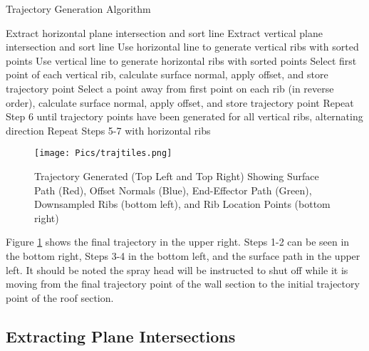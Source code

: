 \begin{algorithm}[H]
\caption{Trajectory Generation Algorithm}
\label{alg:trajgen}
\begin{algorithmic}[1]

    \State Extract horizontal plane intersection and sort line
    \State Extract vertical plane intersection and sort line
    \State Use horizontal line to generate vertical ribs with sorted points
    \State Use vertical line to generate horizontal ribs with sorted points
    \State Select first point of each vertical rib, calculate surface normal, apply offset, and store trajectory point
    \State Select a point  away from first point on each rib (in reverse order), calculate surface normal, apply offset, and store trajectory point
    \State Repeat Step 6 until trajectory points have been generated for all vertical ribs, alternating direction
    \State Repeat Steps 5-7 with horizontal ribs

\end{algorithmic}
\end{algorithm}

\begin{figure}[H]
    \centering
    \texttt{[image: Pics/trajtiles.png]}
    \caption{Trajectory Generated (Top Left and Top Right) Showing Surface Path (Red), Offset Normals (Blue), End-Effector Path (Green), Downsampled Ribs (bottom left), and Rib Location Points (bottom right)}
    \label{fig:trajtiles}
\end{figure}
Figure \ref{fig:trajtiles} shows the final trajectory in the upper right. Steps 1-2 can be seen in the bottom right, Steps 3-4 in the bottom left, and the surface path in the upper left. It should be noted the spray head will be instructed to shut off while it is moving from the final trajectory point of the wall section to the initial trajectory point of the roof section.\\

\subsection{Extracting Plane Intersections}


